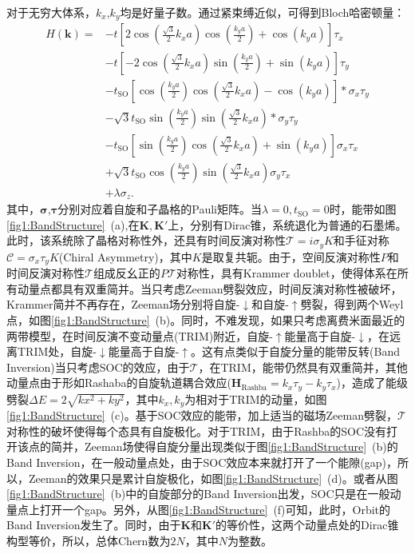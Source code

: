 	对于无穷大体系，$k_x$,$k_y$均是好量子数。通过紧束缚近似，可得到Bloch哈密顿量：
	\begin{equation}
	\begin{aligned}
	H(\mathbf{k})=&-t[2\cos{(\frac{\sqrt{3}}{2}k_x a)}\cos{(\frac{k_y a}{2})}+\cos{(k_y a)}]\tau_x	\\
	&-t[-2\cos{(\frac{\sqrt{3}}{2}k_x a)}\sin{(\frac{k_y a}{2})}+\sin{(k_y a)}]\tau_y\\
	&-t_{\text{SO}} [\cos{(\frac{k_y a}{2})}\cos{(\frac{\sqrt{3}}{2}k_x a)-\cos{(k_y a)}}]*\sigma_x\tau_y\\
	&-\sqrt{3} t_{\text{SO}}\sin{(\frac{k_y a}{2})}\sin{(\frac{\sqrt{3}}{2}k_x a)}*\sigma_y\tau_y\\
	&-t_{\text{SO}} [\sin{(\frac{k_y a}{2})}\cos{(\frac{\sqrt{3}}{2} k_x a)}+\sin{(k_y a)}]\sigma_x\tau_x\\
	&+\sqrt{3}t_{\text{SO}} \cos{(\frac{k_y a}{2})}\sin{(\frac{\sqrt{3}}{2}k_x a)}\sigma_y\tau_x\\
	&+\lambda \sigma_z.
	\end{aligned}
	\end{equation}
	其中，$\mathbf{\sigma}$,$\mathbf{\tau}$分别对应着自旋和子晶格的Pauli矩阵。当$\lambda=0,t_{\text{SO}}=0$时，能带如图\ref{fig1:BandStructure}~(a),在$\mathbf{K},\mathbf{K'}$上，分别有Dirac锥，系统退化为普通的石墨烯。此时，该系统除了晶格对称性外，还具有时间反演对称性$\mathcal{T}=i\sigma_y K$和手征对称$\mathcal{C}=\sigma_x \tau_y K$(Chiral Asymmetry)，其中$K$是取复共轭。由于，空间反演对称性$P$和时间反演对称性$\mathcal{T}$组成反幺正的$P\mathcal{T}$对称性，具有Krammer doublet，使得体系在所有动量点都具有双重简并。当只考虑Zeeman劈裂效应，时间反演对称性被破坏，Krammer简并不再存在，Zeeman场分别将自旋-$\downarrow$和自旋-$\uparrow$劈裂，得到两个Weyl点，如图\ref{fig1:BandStructure}~(b)。同时，不难发现，如果只考虑离费米面最近的两带模型，在时间反演不变动量点(TRIM)附近，自旋-$\uparrow$能量高于自旋-$\downarrow$，在远离TRIM处，自旋-$\downarrow$能量高于自旋-$\uparrow$。这有点类似于自旋分量的能带反转(Band Inversion)当只考虑SOC的效应，由于$\mathcal{T}$，在TRIM，能带仍然具有双重简并，其他动量点由于形如Rashaba的自旋轨道耦合效应($\mathbf{H}_{\text{Rashba}}=k_x\tau_y-k_y\tau_x$)，造成了能级劈裂$\Delta E=2\sqrt{kx^2+ky^2}$，其中$k_x,k_y$为相对于TRIM的动量，如图\ref{fig1:BandStructure}~(c)。基于SOC效应的能带，加上适当的磁场Zeeman劈裂，$\mathcal{T}$对称性的破坏使得每个态具有自旋极化。对于TRIM，由于Rashba的SOC没有打开该点的简并，Zeeman场使得自旋分量出现类似于图\ref{fig1:BandStructure}~(b)的Band Inversion，在一般动量点处，由于SOC效应本来就打开了一个能隙(gap)，所以，Zeeman的效果只是累计自旋极化，如图\ref{fig1:BandStructure}~(d)。或者从图\ref{fig1:BandStructure}~(b)中的自旋部分的Band Inversion出发，SOC只是在一般动量点上打开一个gap。另外，从图\ref{fig1:BandStructure}~(f)可知，此时，Orbit的Band Inversion发生了。同时，由于$\mathbf{K}$和$\mathbf{K}'$的等价性，这两个动量点处的Dirac锥构型等价，所以，总体Chern数为$2N$，其中$N$为整数。
	
